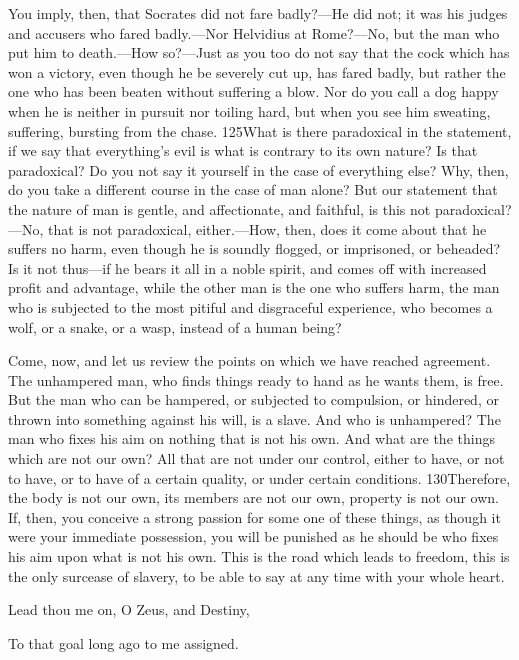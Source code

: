 You imply, then, that Socrates did not fare badly?—He did not; it was his judges and accusers who fared badly.—Nor Helvidius at Rome?—No, but the man who put him to death.—How so?—Just as you too do not say that the cock which has won a victory, even though he be severely cut up, has fared badly, but rather the one who has been beaten without suffering a blow. Nor do you call a dog happy when he is neither in pursuit nor toiling hard, but when you see him sweating, suffering, bursting from the chase. 125What is there paradoxical in the statement, if we say that everything's evil is what is contrary to its own nature? Is that paradoxical? Do you not say it yourself in the case of everything else? Why, then, do you take a different course in the case of man alone? But our statement that the nature of man is gentle, and affectionate, and faithful, is this not paradoxical?—No, that is not paradoxical, either.—How, then, does it come about that he suffers no harm, even though he is soundly flogged, or imprisoned, or beheaded? Is it not thus—if he bears it all in a noble spirit, and comes off with increased profit and advantage, while the other man is the one who suffers harm, the man who is subjected to the most pitiful and disgraceful experience, who becomes a wolf, or a snake, or a wasp, instead of a human being?

Come, now, and let us review the points on which we have reached agreement. The unhampered man, who finds things ready to hand as he wants them, is free. But the man who can be hampered, or subjected to compulsion, or hindered, or thrown into something against his will, is a slave. And who is unhampered? The man who fixes his aim on nothing that is not his own. And what are the things which are not our own? All that are not under our control, either to have, or not to have, or to have of a certain quality, or under certain conditions. 130Therefore, the body is not our own, its members are not our own, property is not our own. If, then, you conceive a strong passion for some one of these things, as though it were your immediate possession, you will be punished as he should be who fixes his aim upon what is not his own. This is the road which leads to freedom, this is the only surcease of slavery, to be able to say at any time with your whole heart.

Lead thou me on, O Zeus, and Destiny,

To that goal long ago to me assigned.

